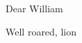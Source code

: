 \documentclass[]{letter}
\begin{document}
\pagestyle{headings}

\begin{letter}{}  %
  \address{laurie.mcclymont@cern.ch\\
  +447951694231}

\opening{Dear William}

\signature{Ben Jonson}

\closing{Well roared, lion}\relax


\end{letter}
\end{document}
